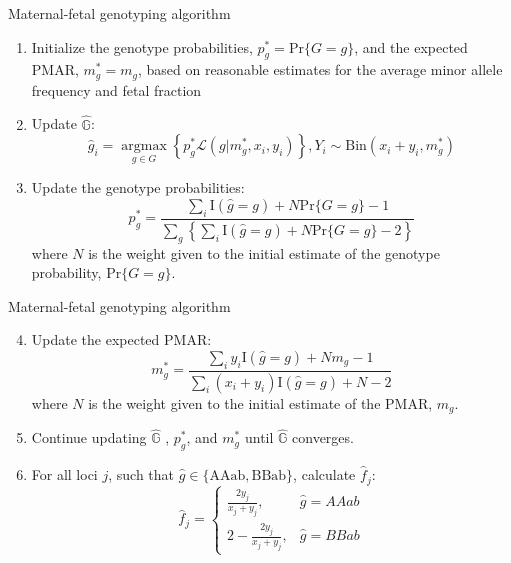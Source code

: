 \documentclass[
  10pt,
  ignorenonframetext,
  m]{beamer}
\begin{document}
\begin{frame}{Maternal-fetal genotyping algorithm}
\protect\hypertarget{maternal-fetal-genotyping-algorithm-1}{}

\begin{enumerate}
\item
  Initialize the genotype probabilities, \(p_g^* = \text{Pr}\{G = g\}\),
  and the expected PMAR, \(m_g^* = m_g\), based on reasonable estimates
  for the average minor allele frequency and fetal fraction
\item
  Update \(\hat{\mathbb{G}}\): \[
   \hat{g}_i = \mathop{\text{argmax}}\limits_{g \in G}\left\{p_g^*\mathcal{L}(g \rvert m_g^*,x_i,y_i)\right\}, Y_{i} \sim \text{Bin}(x_i + y_i, m_g^*) 
    \]
\item
  Update the genotype probabilities: \[
   p_g^* = \frac{\sum_i \text{I}(\hat{g} = g) + N\text{Pr}\{G = g\} - 1}{\sum_g\left\{\sum_i \text{I}(\hat{g} = g) + N\text{Pr}\{G = g\} - 2\right\}}
    \] where \(N\) is the weight given to the initial estimate of the
  genotype probability, \(\text{Pr}\{G = g\}\).
\end{enumerate}

\end{frame}

\begin{frame}{Maternal-fetal genotyping algorithm}
\protect\hypertarget{maternal-fetal-genotyping-algorithm-2}{}

\begin{enumerate}
\setcounter{enumi}{3}
\item
  Update the expected PMAR: \[
   m_g^* = \frac{\sum_i y_i\text{I}(\hat{g} = g) + Nm_g - 1}{\sum_i(x_i + y_i)\text{I}(\hat{g} = g) + N - 2} 
    \] where \(N\) is the weight given to the initial estimate of the
  PMAR, \(m_g\).
\item
  Continue updating \(\hat{\mathbb{G}}\) , \(p_g^*\), and \(m_g^*\)
  until \(\hat{\mathbb{G}}\) converges.
\item
  For all loci \(j\), such that
  \(\hat{g} \in \{\text{AAab}, \text{BBab}\}\), calculate \(\hat{f}_j\):
  \[
  \hat{f}_j =
    \begin{cases}
      \displaystyle\frac{2y_j}{x_j + y_j}, & \hat{g} = AAab \\[15pt]
      2 - \displaystyle\frac{2y_j}{x_j + y_j}, & \hat{g} = BBab
    \end{cases} 
    \]
\end{enumerate}

\end{frame}
\end{document}
